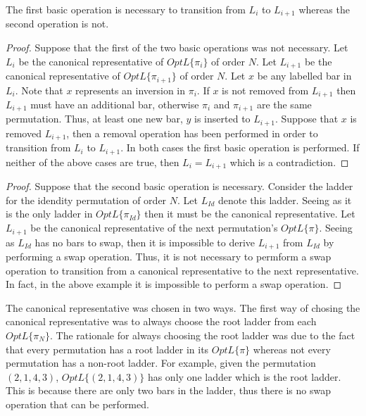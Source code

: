 \begin{theorem} The first basic operation 
is necessary to transition from $L_{i}$ to $L_{i+1}$ whereas the second operation is not.
\end{theorem}

\begin{proof}
    Suppose that the first of the two basic operations was not necessary.
    Let $L_{i}$ be the canonical representative of $OptL\{\pi_{i}\}$ of 
    order $N$. Let $L_{i+1}$ be the canonical representative of $OptL\{\pi_{i+1}\}$
    of order $N$. Let $x$ be any labelled bar in $L_{i}$. Note that $x$ represents an 
    inversion in $\pi_{i}$. If $x$ is not removed from $L_{i+1}$ then $L_{i+1}$ 
    must have an additional bar, otherwise $\pi_{i}$ and $\pi_{i+1}$ are the same permutation.
    Thus, at least one new bar, $y$ is inserted to $L_{i+1}$. Suppose that $x$ is removed $L_{i+1}$,
    then a removal operation has been performed in order to transition from $L_{i}$ 
    to $L_{i+1}$. In both cases the first basic operation is performed. If neither of the above 
    cases are true, then $L_{i}=L_{i+1}$ which is a contradiction.
\end{proof}
\begin{proof}
    Suppose that the second basic operation is necessary. Consider the ladder 
    for the idendity permutation of order $N$. Let $L_{Id}$ denote this ladder. 
    Seeing as it is the only ladder in $OptL\{\pi_{Id}\}$ then it must be the 
    canonical representative. Let $L_{i+1}$ be the canonical representative of 
    the next permutation's $OptL\{\pi\}$. Seeing as $L_{Id}$ has no bars to swap, 
   then it is impossible to derive $L_{i+1}$ from $L_{Id}$ by performing a 
   swap operation. Thus, it is not necessary to permform a swap operation to transition 
   from a canonical representative to the next representative. In fact, in the above example 
   it is impossible to perform a swap operation. 
\end{proof}
The canonical representative was chosen in two ways. The first way of 
chosing the canonical representative was to always choose the root ladder from each $OptL\{\pi_{N}\}$.
The rationale for always choosing the root ladder was due to the fact that every 
permutation has a root ladder in its $OptL\{\pi\}$ whereas not every permutation 
has a non-root ladder. For example, given the permutation $(2,1,4,3)$, $OptL\{(2,1,4,3)\}$
has only one ladder which is the root ladder. This is because there are only two 
bars in the ladder, thus there is no swap operation that can be performed.
